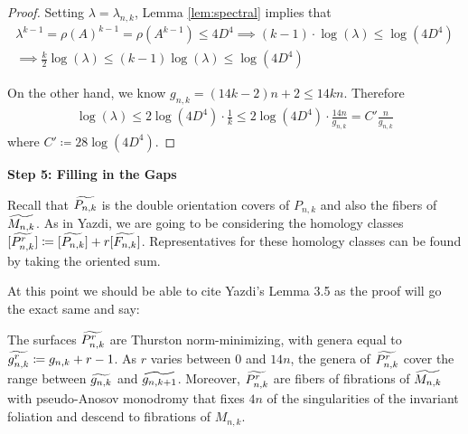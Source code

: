 \begin{proof}
Setting $\lambda = \lambda_{n,k}$, Lemma \ref{lem:spectral} implies that
\begin{gather*}
    \lambda^{k-1} = \rho(A)^{k-1} = \rho(A^{k-1}) \leq 4D^4 \implies (k-1)\cdot \log(\lambda) \leq \log(4D^4) \\
    \implies \frac{k}{2}\log(\lambda) \leq (k-1)\log(\lambda) \leq \log(4D^4)
\end{gather*}

On the other hand, we know $g_{n,k} = (14k - 2)n + 2 \leq 14kn$. Therefore
\begin{align*}
    \log(\lambda) \leq 2\log(4D^4)\cdot\frac{1}{k} \leq 2\log(4D^4)\cdot \frac{14n}{g_{n,k}} = C'\frac{n}{g_{n,k}}
\end{align*}
where $C' \coloneqq 28\log(4D^4)$.
\end{proof}

\begin{center}
\textbf{Step 5: Filling in the Gaps}    
\end{center}

Recall that $\widetilde{P_{n,k}}$ is the double orientation covers of $P_{n,k}$ and also the fibers of $\widetilde{M_{n,k}}$. As in Yazdi, we are going to be considering the homology classes $[\widetilde{P^r_{n,k}}] \coloneqq [\widetilde{P_{n,k}}] + r[\widetilde{F_{n,k}}]$. Representatives for these homology classes can be found by taking the oriented sum.

At this point we should be able to cite Yazdi's Lemma 3.5 as the proof will go the exact same and say:

\begin{lem}
The surfaces $\widetilde{P^r_{n,k}}$ are Thurston norm-minimizing, with genera equal to $\widetilde{g^r_{n,k}} \coloneqq g_{n,k} + r - 1$. As $r$ varies between $0$ and $14n$, the genera of $\widetilde{P^r_{n,k}}$ cover the range between $\widetilde{g_{n,k}}$ and $\widetilde{g_{n,k+1}}$. Moreover, $\widetilde{P^r_{n,k}}$ are fibers of fibrations of $\widetilde{M_{n,k}}$ with pseudo-Anosov monodromy that fixes $4n$ of the singularities of the invariant foliation and descend to fibrations of $M_{n,k}$.
\end{lem}

